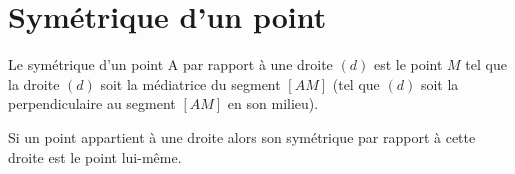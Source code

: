 \documentclass[a4paper,10pt]{report}
\begin{document}
\vspace{-0.5cm}
\section{Symétrique d'un point}

\begin{defn}
Le symétrique d'un point A par rapport à une droite $(d)$ est le point $M$ tel que la droite $(d)$ soit la médiatrice du segment $[AM]$ (tel que $(d)$ soit la perpendiculaire au segment $[AM]$ en son milieu).
\end{defn}

\begin{rem}
Si un point appartient à une droite alors son symétrique par rapport à cette droite est le point lui-même.
\end{rem}
\end{document}
